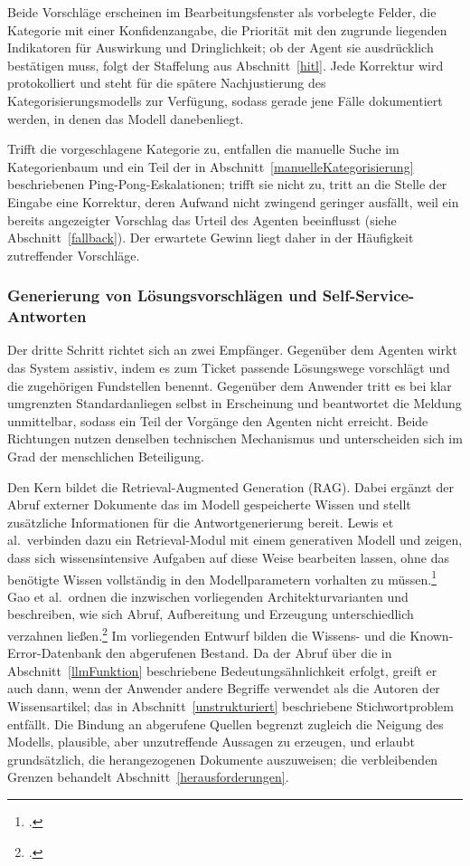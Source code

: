 Beide Vorschl\"age erscheinen im Bearbeitungsfenster als vorbelegte Felder, die Kategorie mit einer Konfidenzangabe, die Priorit\"at mit den zugrunde liegenden Indikatoren f\"ur Auswirkung und Dringlichkeit; ob der Agent sie ausdr\"ucklich best\"atigen muss, folgt der Staffelung aus Abschnitt~\ref{hitl}. Jede Korrektur wird protokolliert und steht f\"ur die sp\"atere Nachjustierung des Kategorisierungsmodells zur Verf\"ugung, sodass gerade jene F\"alle dokumentiert werden, in denen das Modell danebenliegt.

Trifft die vorgeschlagene Kategorie zu, entfallen die manuelle Suche im Kategorienbaum und ein Teil der in Abschnitt~\ref{manuelleKategorisierung} beschriebenen Ping-Pong-Eskalationen; trifft sie nicht zu, tritt an die Stelle der Eingabe eine Korrektur, deren Aufwand nicht zwingend geringer ausf\"allt, weil ein bereits angezeigter Vorschlag das Urteil des Agenten beeinflusst (siehe Abschnitt~\ref{fallback}). Der erwartete Gewinn liegt daher in der H\"aufigkeit zutreffender Vorschl\"age.

\subsubsection{Generierung von Lösungsvorschlägen und Self-Service-Antworten}
\label{loesungsvorschlaege}

Der dritte Schritt richtet sich an zwei Empf\"anger. Gegen\"uber dem Agenten wirkt das System assistiv, indem es zum Ticket passende L\"osungswege vorschl\"agt und die zugeh\"origen Fundstellen benennt. Gegen\"uber dem Anwender tritt es bei klar umgrenzten Standardanliegen selbst in Erscheinung und beantwortet die Meldung unmittelbar, sodass ein Teil der Vorg\"ange den Agenten nicht erreicht. Beide Richtungen nutzen denselben technischen Mechanismus und unterscheiden sich im Grad der menschlichen Beteiligung.

Den Kern bildet die Retrieval-Augmented Generation (RAG). Dabei erg\"anzt der Abruf externer Dokumente das im Modell gespeicherte Wissen und stellt zus\"atzliche Informationen f\"ur die Antwortgenerierung bereit. Lewis et al.~verbinden dazu ein Retrieval-Modul mit einem generativen Modell und zeigen, dass sich wissensintensive Aufgaben auf diese Weise bearbeiten lassen, ohne das ben\"otigte Wissen vollst\"andig in den Modellparametern vorhalten zu m\"ussen.\footcite[Vgl.][hier S.~9459\,f.]{Lewis2020} Gao et al.~ordnen die inzwischen vorliegenden Architekturvarianten und beschreiben, wie sich Abruf, Aufbereitung und Erzeugung unterschiedlich verzahnen lie{\ss}en.\footcite[Vgl.][S.~2]{Gao2023} Im vorliegenden Entwurf bilden die Wissens- und die Known-Error-Datenbank den abgerufenen Bestand. Da der Abruf \"uber die in Abschnitt~\ref{llmFunktion} beschriebene Bedeutungs\"ahnlichkeit erfolgt, greift er auch dann, wenn der Anwender andere Begriffe verwendet als die Autoren der Wissensartikel; das in Abschnitt~\ref{unstrukturiert} beschriebene Stichwortproblem entf\"allt. Die Bindung an abgerufene Quellen begrenzt zugleich die Neigung des Modells, plausible, aber unzutreffende Aussagen zu erzeugen, und erlaubt grunds\"atzlich, die herangezogenen Dokumente auszuweisen; die verbleibenden Grenzen behandelt Abschnitt~\ref{herausforderungen}.

